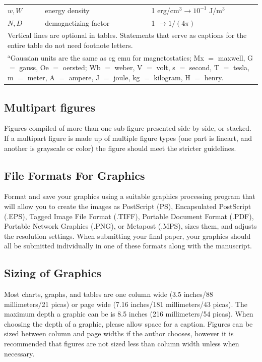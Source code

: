 \documentclass{IEEEtran}
\begin{document}
\begin{table}
\begin{tabular}{|p{25pt}|p{75pt}|p{115pt}|}
$w, W$& 
energy density& 
1 erg/cm$^{3} \to  10^{-1}$ J/m$^{3}$ \\
$N, D$& 
demagnetizing factor& 
1 $\to  1/(4\pi )$ \\
\hline
\multicolumn{3}{p{251pt}}{Vertical lines are optional in tables. Statements that serve as captions for 
the entire table do not need footnote letters. }\\
\multicolumn{3}{p{251pt}}{$^{\mathrm{a}}$Gaussian units are the same as cg emu for magnetostatics; Mx 
$=$ maxwell, G $=$ gauss, Oe $=$ oersted; Wb $=$ weber, V $=$ volt, s $=$ 
second, T $=$ tesla, m $=$ meter, A $=$ ampere, J $=$ joule, kg $=$ 
kilogram, H $=$ henry.}
\end{tabular}
\label{tab1}
\end{table}

\subsection{Multipart figures}
Figures compiled of more than one sub-figure presented side-by-side, or 
stacked. If a multipart figure is made up of multiple figure
types (one part is lineart, and another is grayscale or color) the figure 
should meet the stricter guidelines.

\subsection{File Formats For Graphics}\label{formats}
Format and save your graphics using a suitable graphics processing program 
that will allow you to create the images as PostScript (PS), Encapsulated 
PostScript (.EPS), Tagged Image File Format (.TIFF), Portable Document 
Format (.PDF), Portable Network Graphics (.PNG), or Metapost (.MPS), sizes them, and adjusts 
the resolution settings. When 
submitting your final paper, your graphics should all be submitted 
individually in one of these formats along with the manuscript.

\subsection{Sizing of Graphics}
Most charts, graphs, and tables are one column wide (3.5 inches/88 
millimeters/21 picas) or page wide (7.16 inches/181 millimeters/43 
picas). The maximum depth a graphic can be is 8.5 inches (216 millimeters/54
picas). When choosing the depth of a graphic, please allow space for a 
caption. Figures can be sized between column and page widths if the author 
chooses, however it is recommended that figures are not sized less than 
column width unless when necessary. 
\end{document}
